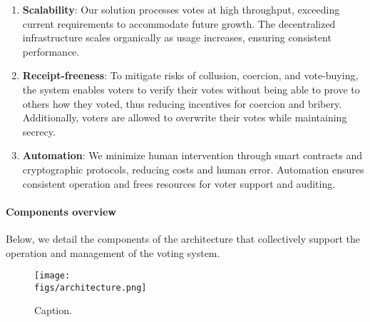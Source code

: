 \begin{enumerate}
	\item \textbf{Scalability}: Our solution processes votes at high throughput, exceeding current requirements to accommodate future growth. The decentralized infrastructure scales organically as usage increases, ensuring consistent performance.
	
	\item \textbf{Receipt-freeness}: To mitigate risks of collusion, coercion, and vote-buying, the system enables voters to verify their votes without being able to prove to others how they voted, thus reducing incentives for coercion and bribery. Additionally, voters are allowed to overwrite their votes while maintaining secrecy.
	
	\item \textbf{Automation}: We minimize human intervention through smart contracts and cryptographic protocols, reducing costs and human error. Automation ensures consistent operation and frees resources for voter support and auditing.
\end{enumerate}

\paragraph{Components overview}

Below, we detail the components of the architecture that collectively support the operation and management of the voting system.


\begin{figure}[h]
	\centerline{\texttt{[image: \\figs/architecture.png]}}
	\caption{Caption.}
	\label{fig:circuit-inputs}
\end{figure}


